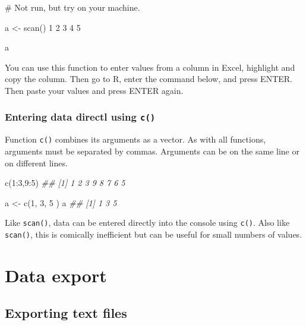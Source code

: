 \documentclass[
  13,
  letterpaper,
]{report}
\newenvironment{Shaded}{\begin{snugshade}}{\end{snugshade}}
\newcommand{\CommentTok}[1]{\textcolor[rgb]{0.37,0.37,0.37}{#1}}
\newcommand{\DecValTok}[1]{\textcolor[rgb]{0.68,0.00,0.00}{#1}}
\newcommand{\DocumentationTok}[1]{\textcolor[rgb]{0.37,0.37,0.37}{\textit{#1}}}
\newcommand{\FunctionTok}[1]{\textcolor[rgb]{0.28,0.35,0.67}{#1}}
\newcommand{\NormalTok}[1]{\textcolor[rgb]{0.00,0.23,0.31}{#1}}
\newcommand{\OtherTok}[1]{\textcolor[rgb]{0.00,0.23,0.31}{#1}}
\newcommand{\SpecialCharTok}[1]{\textcolor[rgb]{0.37,0.37,0.37}{#1}}
\begin{document}
\begin{Shaded}
\begin{Highlighting}[]
\CommentTok{\# Not run, but try on your machine.}

\NormalTok{a }\OtherTok{\textless{}{-}} \FunctionTok{scan}\NormalTok{()}
\DecValTok{1}
\DecValTok{2}
\DecValTok{3}
\DecValTok{4}
\DecValTok{5}


\NormalTok{a}
\end{Highlighting}
\end{Shaded}

You can use this function to enter values from a column in Excel,
highlight and copy the column. Then go to R, enter the command below,
and press ENTER. Then paste your values and press ENTER again.

\subsubsection{\texorpdfstring{Entering data directl using
\texttt{c()}}{Entering data directl using c()}}\label{sec-04-import-special-c}

Function \texttt{c()} combines its arguments as a vector. As with all
functions, arguments must be separated by commas. Arguments can be on
the same line or on different lines.

\begin{Shaded}
\begin{Highlighting}[]

\FunctionTok{c}\NormalTok{(}\DecValTok{1}\SpecialCharTok{:}\DecValTok{3}\NormalTok{,}\DecValTok{9}\SpecialCharTok{:}\DecValTok{5}\NormalTok{)}
\DocumentationTok{\#\# [1] 1 2 3 9 8 7 6 5}

\NormalTok{a }\OtherTok{\textless{}{-}} \FunctionTok{c}\NormalTok{(}\DecValTok{1}\NormalTok{,}
      \DecValTok{3}\NormalTok{,}
       \DecValTok{5}
\NormalTok{       )}
\NormalTok{a}
\DocumentationTok{\#\# [1] 1 3 5}
\end{Highlighting}
\end{Shaded}

Like \texttt{scan()}, data can be entered directly into the console
using \texttt{c()}. Also like \texttt{scan()}, this is comically
inefficient but can be useful for small numbers of values.

\section{Data export}\label{sec-04-export}

\subsection{Exporting text files}\label{sec-04-export-text}
\end{document}
